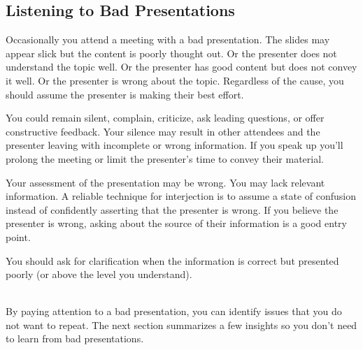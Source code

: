 \subsection*{Listening to Bad Presentations\label{sec:bad-presentations}}

Occasionally you attend a meeting with a bad presentation. The slides may appear slick but the content is poorly thought out. Or the presenter does not understand the topic well. Or the presenter has good content but does not convey it well. Or the presenter is wrong about the topic. Regardless of the cause, you should assume the presenter is making their best effort. 

You could remain silent, complain, criticize, ask leading questions, or offer constructive feedback. Your silence may result in other attendees and the presenter leaving with incomplete or wrong information. If you speak up you'll prolong the meeting or limit the presenter's time to convey their material. 

Your assessment of the presentation may be wrong. You may lack relevant information. A reliable technique for interjection is to assume a state of confusion instead of confidently asserting that the presenter is wrong. 
If you believe the presenter is wrong, asking about the source of their information is a good entry point.

You should ask for clarification when the information is correct but presented poorly (or above the level you understand). 

\ \\


By paying attention to a bad presentation, you can  identify issues that you do not want to repeat. The next section summarizes a few insights so you don't need to learn from bad presentations.